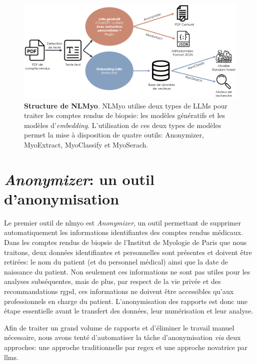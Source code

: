\begin{figure}[htbp]
 \centering
 \includegraphics[width=1\textwidth]{figures/nlmyo_struct.png}
 \caption[Structure de NLMyo]{\textbf{Structure de NLMyo}. NLMyo utilise deux types de LLMs pour traiter les comptes rendus de biopsie: les modèles génératifs et les modèles d'\textit{embedding}. L'utilisation de ces deux types de modèles permet la mise à disposition de quatre outils: Anonymizer, MyoExtract, MyoClassify et MyoSerach.}
 \label{fig:nlmyo_struct}
\end{figure}

\section{\textit{Anonymizer}: un outil d'anonymisation}
Le premier outil de \gls{nlmyo} est \textit{Anonymizer}, un outil permettant de supprimer automatiquement les informations identifiantes des comptes rendus médicaux. Dans les comptes rendus de biopsie de l'Institut de Myologie de Paris que nous traitons, deux données identifiantes et personnelles sont présentes et doivent être retirées: le nom du patient (et du personnel médical) ainsi que la date de naissance du patient. Non seulement ces informations ne sont pas utiles pour les analyses subséquentes, mais de plus, par respect de la vie privée et des recommandations \gls{rgpd}, ces informations ne doivent être accessibles qu'aux professionnels en charge du patient. L'anonymisation des rapports est donc une étape essentielle avant le transfert des données, leur numérisation et leur analyse.

Afin de traiter un grand volume de rapports et d'éliminer le travail manuel nécessaire, nous avons tenté d'automatiser la tâche d'anonymisation \textit{via} deux approches: une approche traditionnelle par \gls{regex} et une approche novatrice par \gls{llms}.

